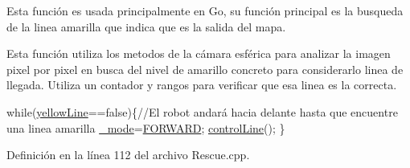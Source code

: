 Esta función es usada principalmente en Go, su función principal es la busqueda de la linea amarilla que indica que es la salida del mapa. 

Esta función utiliza los metodos de la cámara esférica para analizar la imagen pixel por pixel en busca del nivel de amarillo concreto para considerarlo linea de llegada. Utiliza un contador y rangos para verificar que esa linea es la correcta. 
\begin{DoxyCode}
\textcolor{keywordflow}{while}(\hyperlink{classRescue_ab1ea1e98e62403dc681f26529805fe2a_ab1ea1e98e62403dc681f26529805fe2a}{yellowLine}==\textcolor{keyword}{false})\{\textcolor{comment}{//El robot andará hacia delante hasta que encuentre una linea amarilla}
    \hyperlink{classRescue_a70a5e292c84029568ff6c0de2f2d9f43_a70a5e292c84029568ff6c0de2f2d9f43}{\_mode}=\hyperlink{classRescue_ab44ced9ce57b1b0d19b5456cd952d702_ab44ced9ce57b1b0d19b5456cd952d702ac5b8fd2a28d3d22c89095ccb90ea6e2a}{FORWARD};
    \hyperlink{classRescue_aeef91de334e7779ce2fb2c2b57cd70c3_aeef91de334e7779ce2fb2c2b57cd70c3}{controlLine}();
\}
\end{DoxyCode}
 

Definición en la línea 112 del archivo Rescue.\+cpp.


